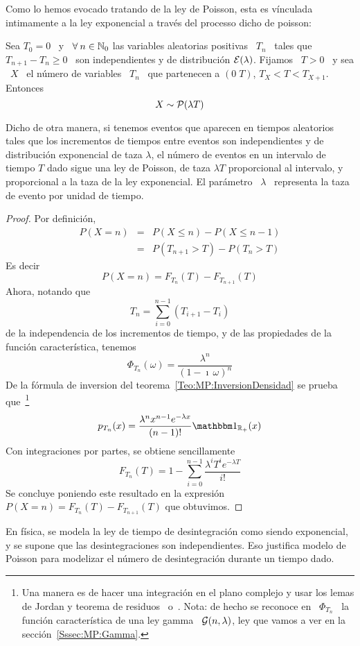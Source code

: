 Como  lo hemos  evocado  tratando de  la  ley de  Poisson,  esta es  v\'inculada
intimamente a la ley exponencial a trav\'es del processo dicho de poisson:
%
\begin{lema}
\label{Lem:MP:VinculoExponencialPoisson}
%
  Sea  $T_0 =  0$ \  y \  $\forall \:  n \in  \Nset_0$ las  variables aleatorias
  positivas \ $T_n$ \ tales que $T_{n+1}  - T_n \ge 0$ \ son independientes y de
  distribuci\'on $\E(\lambda)$. Fijamos \ $T > 0$ \ y sea \ $X$ \ el n\'umero de
  variables  \  $T_n$  \  que  partenecen  a   $(0  \;  T)$,  \ie  $T_X  <  T  <
  T_{X+1}$. Entonces
  \[
  X \sim \P(\lambda T)
  \]
\end{lema}
%
Dicho  de otra manera,  si tenemos  eventos que  aparecen en  tiempos aleatorios
tales  que los  incrementos de  tiempos entre  eventos son  independientes  y de
distribuci\'on  exponencial de  taza $\lambda$,  el  n\'umero de  eventos en  un
intervalo  de tiempo $T$  dado sigue  una ley  de Poisson,  de taza  $\lambda T$
proporcional al  intervalo, y proporcional a  la taza de la  ley exponencial. El
par\'ametro \ $\lambda$ \ representa la taza de evento por unidad de tiempo.
%
\begin{proof}
Por definici\'on,
%
\begin{eqnarray*}
P(X = n) & = & P(X\le n) - P(X \le n-1) \\[2mm]
%
& = & P(T_{n+1} > T) - P(T_n > T)
\end{eqnarray*}
%
Es decir
%
\[
P(X = n) = F_{T_n}(T) - F_{T_{n+1}}(T)
\]
%
Ahora, notando que
%
\[
T_n = \sum_{i=0}^{n-1} \left( T_{i+1} - T_i \right)
\]
%
de la  independencia de los  incrementos de tiempo,  y de las propiedades  de la
funci\'on caracter\'istica, tenemos
%
\[
\Phi_{T_n}(\omega) = \frac{\lambda^n}{(1-\imath \, \omega)^n}
\]
%
De  la  f\'ormula  de  inversion del  teorema~\ref{Teo:MP:InversionDensidad}  se
prueba  que~\footnote{Una manera  es  de  hacer una  integraci\'on  en el  plano
  complejo  y usar  los lemas  de Jordan  y teorema  de residuos~\cite{CarKro05}
  o~\cite[Cap.~4]{AblFok03}.  Nota: de hecho se  reconoce en \ $\Phi_{T_n}$ \ la
  funci\'on caracter\'istica de una ley gamma \ $\G(n,\lambda)$, ley que vamos a
  ver en la secci\'on~\ref{Sssec:MP:Gamma}.}
%
\[
p_{T_n}(x) = \frac{\lambda^n x^{n-1} e^{-\lambda x}}{(n-1)!} \un_{\Rset_+}(x)
\]
%
Con integraciones por partes, se obtiene sencillamente
%
\[
F_{T_n}(T) = 1 - \sum_{i=0}^{n-1} \frac{\lambda^i T^i e^{-\lambda T}}{i!}
\]
%
Se concluye poniendo  este resultado en la expresi\'on $P(X =  n) = F_{T_n}(T) -
F_{T_{n+1}}(T)$ que obtuvimos.
\end{proof}
%
En  f\'isica,  se  modela la  ley  de  tiempo  de desintegraci\'on  como  siendo
exponencial,  y  se supone  que  las  desintegraciones  son independientes.  Eso
justifica  modelo de  Poisson  para modelizar  el  n\'umero de  desintegraci\'on
durante un tiempo dado.

